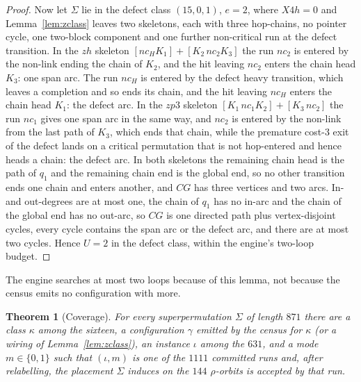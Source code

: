 \documentclass[10pt]{article}
\newtheorem{theorem}{Theorem}[section]
\theoremstyle{remark}
\theoremstyle{plain}
\begin{document}
\begin{proof}
Now let $\Sigma$ lie in the defect class $(15,0,1)$, $e=2$, where
$X4h=0$ and Lemma~\ref{lem:zclass} leaves two skeletons, each with
three hop-chains, no pointer cycle, one two-block component and one
further non-critical run at the defect transition.  In the $zh$
skeleton $[\mathit{nc}_H K_1]+[K_2\,\mathit{nc}_2 K_3]$ the run
$\mathit{nc}_2$ is entered by the non-link ending the chain of $K_2$,
and the hit leaving $\mathit{nc}_2$ enters the chain head $K_3$: one
span arc.  The run $\mathit{nc}_H$ is entered by the defect heavy
transition, which leaves a completion and so ends its chain, and the
hit leaving $\mathit{nc}_H$ enters the chain head $K_1$: the defect
arc.  In the $zp3$ skeleton
$[K_1\,\mathit{nc}_1 K_2]+[K_3\,\mathit{nc}_2]$ the run
$\mathit{nc}_1$ gives one span arc in the same way, and
$\mathit{nc}_2$ is entered by the non-link from the last path of
$K_3$, which ends that chain, while the premature cost-3 exit of the
defect lands on a critical permutation that is not hop-entered and
hence heads a chain: the defect arc.  In both skeletons the remaining
chain head is the path of $q_1$ and the remaining chain end is the
global end, so no other transition ends one chain and enters another,
and $CG$ has three vertices and two arcs.  In- and out-degrees are at
most one, the chain of $q_1$ has no in-arc and the chain of the global
end has no out-arc, so $CG$ is one directed path plus vertex-disjoint
cycles, every cycle contains the span arc or the defect arc, and there
are at most two cycles.  Hence $U=2$ in the defect class, within the
engine's two-loop budget.
\end{proof}

The engine searches at most two loops because of this lemma, not
because the census emits no configuration with more.

\begin{theorem}[Coverage]\label{thm:coverage}
For every superpermutation $\Sigma$ of length $871$ there are a class
$\kappa$ among the sixteen, a configuration $\gamma$ emitted by the
census for $\kappa$ (or a wiring of Lemma~\ref{lem:zclass}), an
instance $\iota$ among the $631$, and a mode $m\in\{0,1\}$ such that
$(\iota,m)$ is one of the $1111$ committed runs and, after
relabelling, the placement $\Sigma$ induces on the $144$ $\rho$-orbits
is accepted by that run.
\end{theorem}
\end{document}
